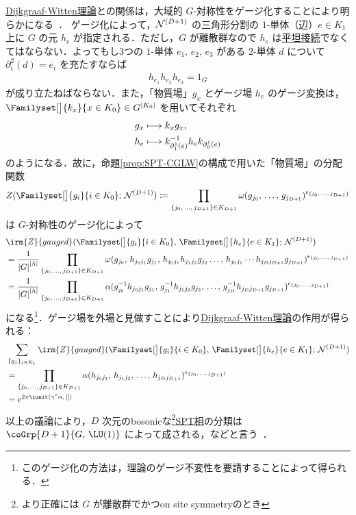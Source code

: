 \documentclass[TQFT_main]{subfiles}
\begin{document}
\hyperref[def:Dijkgraaf-Witten]{Dijkgraaf-Witten理論}との関係は，大域的 $G$-対称性をゲージ化することにより明らかになる~\cite[APPENDIX E]{Wen2014SPT}．
ゲージ化によって，$\mathcal{N}^{(D+1)}$ の三角形分割の $1$-単体（辺）$e \in K_1$ 上に $G$ の元 $h_e$ が指定される．ただし，$G$ が離散群なので $h_{e}$ は\hyperref[def:flat-connection-homotopy]{平坦接続}でなくてはならない．よってもし3つの $1$-単体 $e_1,\, e_2,\, e_3$ がある $2$-単体 $d$ について $\partial_i^2 (d) = e_i$ を充たすならば
\begin{align}
    h_{e_1} h_{e_2} h_{e_3} = 1_G
\end{align}
が成り立たねばならない．また，「物質場」$g_{x}$ とゲージ場 $h_{e}$ のゲージ変換は，$\Familyset[\big]{k_x}{x \in K_0} \in G^{\abs{K_0}}$ を用いてそれぞれ
\begin{align}
    g_x &\longmapsto k_x g_x, \\
    h_e &\longmapsto k_{\partial_1^1(e)}^{-1} h_e k_{\partial_0^1(e)}
\end{align}
のようになる．故に，命題\ref{prop:SPT-CGLW}の構成で用いた「物質場」の分配関数
\begin{align}
    Z(\Familyset[\big]{g_{i}}{i \in K_0};\, \mfdcal{N}{D+1}) \coloneqq \prod_{\{j_0,\, \dots,\, j_{D+1}\} \in K_{D+1}} \omega (g_{j_0},\, \dots,\, g_{j_{D+1}})^{\epsilon_{\{j_0,\, \dots,\, j_{D+1}\}}}
\end{align}
は $G$-対称性のゲージ化によって
\begin{align}
    &\irm{Z}{gauged}(\Familyset[\big]{g_{i}}{i \in K_0},\, \Familyset[\big]{h_{e}}{e \in K_1};\,\mfdcal{N}{D+1}) \\   
    &= \frac{1}{\abs{G}^{\abs{\Lambda}}} \prod_{\{j_0,\, \dots,\, j_{D+1}\} \in K_{D+1}} \omega (g_{j_0},\, h_{j_0j_1} g_{j_1},\, h_{j_0j_1}h_{j_1j_2} g_{j_2} \dots,\, h_{j_0j_1} \cdots h_{j_D j_{D+1}}g_{j_{D+1}})^{\epsilon_{\{j_0,\, \dots,\, j_{D+1}\}}} \\
    &= \frac{1}{\abs{G}^{\abs{\Lambda}}} \prod_{\{j_0,\, \dots,\, j_{D+1}\} \in K_{D+1}} \alpha (g_{j_0}^{-1}h_{j_0j_1} g_{j_1},\, g_{j_1}^{-1} h_{j_1j_2} g_{j_2},\, \dots,\,g_{j_D}^{-1} h_{j_D j_{D+1}}g_{j_{D+1}})^{\epsilon_{\{j_0,\, \dots,\, j_{D+1}\}}}
\end{align}
になる\footnote{このゲージ化の方法は，理論のゲージ不変性を要請することによって得られる．}．ゲージ場を外場と見做すことにより\hyperref[def:Dijkgraaf-Witten]{Dijkgraaf-Witten理論}の作用が得られる：
\begin{align}
    &\sum_{\{g_{j}\}_{j \in K_1}} \irm{Z}{gauged}(\Familyset[\big]{g_{i}}{i \in K_0},\, \Familyset[\big]{h_{e}}{e \in K_1};\,\mfdcal{N}{D+1}) \\
    &= \prod_{\{j_0,\, \dots,\, j_{D+1}\} \in K_{D+1}} \alpha (h_{j_0j_1},\, h_{j_1j_2},\, \dots,\, h_{j_D j_{D+1}})^{\epsilon_{\{j_0,\, \dots,\, j_{D+1}\}}} \\
    &= e^{2\pi \iunit \expval{\gamma^* \alpha,\, []}}
\end{align}
以上の議論により，$D$ 次元のbosonicな\footnote{より正確には $G$ が離散群でかつon site symmetryのとき}\hyperref[def:SPT-traditional]{SPT相}の分類は $\coGrp{D+1}{G,\, \LU(1)}$ によって成される，などと言う~\cite{ChenGuLiuWen2013}．
\end{document}
